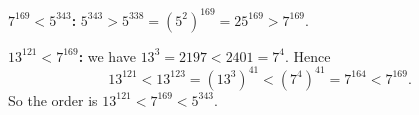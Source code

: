 \textbf{$7^{169}<5^{343}$:} $5^{343}>5^{338}=(5^2)^{169}=25^{169}>7^{169}$.

\textbf{$13^{121}<7^{169}$:} we have $13^3=2197<2401=7^4$. Hence
\[
13^{121}<13^{123}=(13^3)^{41}<(7^4)^{41}=7^{164}<7^{169}.
\]
So the order is $\boxed{13^{121}<7^{169}<5^{343}}$.
